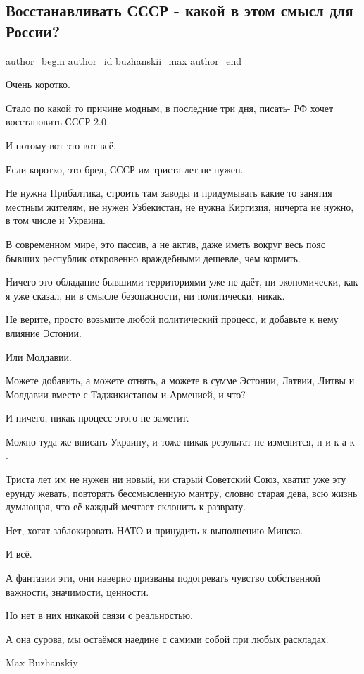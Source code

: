  
 
 
 
 
 
\subsection{Восстанавливать СССР - какой в этом смысл для России?}
\label{sec:30_01_2022.fb.buzhanskii_max.1.sssr_rossia}
 
\ifcmt
 author_begin
   author_id buzhanskii_max
 author_end
\fi

Очень коротко.

Стало по какой то причине модным, в последние три дня, писать- РФ хочет
восстановить СССР 2.0

И потому вот это вот всё.

Если коротко, это бред, СССР им триста лет не нужен.

Не нужна Прибалтика, строить там заводы и придумывать какие то занятия местным
жителям, не нужен Узбекистан, не нужна Киргизия, ничерта не нужно, в том числе
и Украина.

В современном мире, это пассив, а не актив, даже иметь вокруг весь пояс бывших
республик откровенно враждебными дешевле, чем кормить.

Ничего это обладание бывшими территориями уже не даёт, ни экономически, как я
уже сказал, ни в смысле безопасности, ни политически, никак.

Не верите, просто возьмите любой политический процесс, и добавьте к нему
влияние Эстонии.

Или Молдавии.

Можете добавить, а можете отнять, а можете в сумме Эстонии, Латвии, Литвы и
Молдавии вместе с Таджикистаном и Арменией, и что?

И ничего, никак процесс этого не заметит.

Можно туда же вписать Украину, и тоже никак результат не изменится, н и к а к .

Триста лет им не нужен ни новый, ни старый Советский Союз, хватит уже эту
ерунду жевать, повторять бессмысленную мантру, словно старая дева, всю жизнь
думающая, что её каждый мечтает склонить к разврату.

Нет, хотят заблокировать НАТО и принудить к выполнению Минска.

И всё.

А фантазии эти, они наверно призваны подогревать чувство собственной важности,
значимости, ценности.

Но нет в них никакой связи с реальностью.

А она сурова, мы остаёмся наедине с самими собой при любых раскладах.

Max Buzhanskiy
